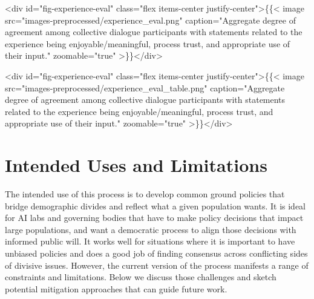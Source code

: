 \documentclass{article}
\begin{document}
<div id="fig-experience-eval" class="flex items-center justify-center">\{\{< image src="images-preprocessed/experience_eval.png" caption="Aggregate degree of agreement among collective dialogue participants with statements related to the experience being enjoyable/meaningful, process trust, and appropriate use of their input." zoomable="true" >\}\}</div>


<div id="fig-experience-eval" class="flex items-center justify-center">\{\{< image src="images-preprocessed/experience_eval_table.png" caption="Aggregate degree of agreement among collective dialogue participants with statements related to the experience being enjoyable/meaningful, process trust, and appropriate use of their input." zoomable="true" >\}\}</div>





\section{Intended Uses and Limitations}
The intended use of this process is to develop common ground policies that bridge demographic divides and reflect what a given population wants. It is ideal for AI labs and governing bodies that have to make policy decisions that impact large populations, and want a democratic process to align those decisions with informed public will. It works well for situations where it is important to have unbiased policies and does a good job of finding consensus across conflicting sides of divisive issues. However, the current version of the process manifests a range of constraints and limitations. Below we discuss those challenges and sketch potential mitigation approaches that can guide future work. 
\end{document}
